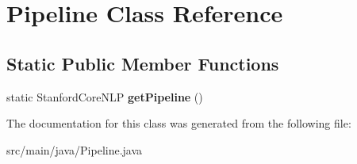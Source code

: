 \hypertarget{classPipeline}{}\section{Pipeline Class Reference}
\label{classPipeline}
\subsection*{Static Public Member Functions}
\begin{DoxyCompactItemize}
\item 
\mbox{\label{classPipeline_a6cbe1c432059b372e10d85612d4a2e40}} 
static Stanford\+Core\+N\+LP {\bfseries get\+Pipeline} ()
\end{DoxyCompactItemize}


The documentation for this class was generated from the following file\+:\begin{DoxyCompactItemize}
\item 
src/main/java/Pipeline.\+java\end{DoxyCompactItemize}
